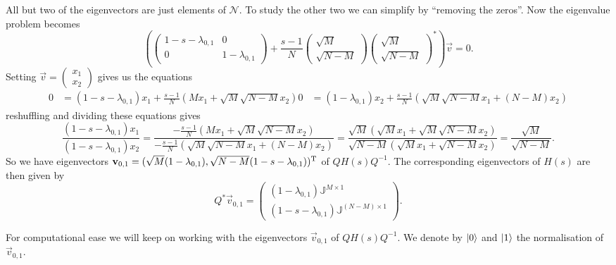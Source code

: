 All but two of the eigenvectors are just elements of $\mathcal{N}$. To study the other two we can simplify by ``removing the zeros''. Now the eigenvalue problem becomes
\[ \left(\begin{pmatrix}
1-s-\lambda_{0,1} & 0 \\ 0 & 1 -\lambda_{0,1}
\end{pmatrix} + \frac{s-1}{N}\begin{pmatrix}
\sqrt{M} \\ \sqrt{N-M}
\end{pmatrix}\begin{pmatrix}
\sqrt{M} \\ \sqrt{N-M}
\end{pmatrix}^*\right)\vec{v} = 0. \]
Setting $\vec{v} = \begin{pmatrix}
x_1 \\ x_2
\end{pmatrix}$ gives us the equations
\begin{align*}
0 &= (1-s-\lambda_{0,1})x_1 + \frac{s-1}{N}(Mx_1 + \sqrt{M}\sqrt{N-M}x_2)
0 &= (1-\lambda_{0,1})x_2 + \frac{s-1}{N}(\sqrt{M}\sqrt{N-M}x_1 + (N-M)x_2)
\end{align*}
reshuffling and dividing these equations gives
\[ \frac{(1-s-\lambda_{0,1})x_1}{(1-s-\lambda_{0,1})x_2} = \frac{-\frac{s-1}{N}(Mx_1 + \sqrt{M}\sqrt{N-M}x_2)}{-\frac{s-1}{N}(\sqrt{M}\sqrt{N-M}x_1 + (N-M)x_2)} = \frac{\sqrt{M}(\sqrt{M}x_1 + \sqrt{M}\sqrt{N-M}x_2)}{\sqrt{N-M}(\sqrt{M}x_1 + \sqrt{N-M}x_2)} = \frac{\sqrt{M}}{\sqrt{N-M}}. \]
So we have eigenvectors $\bm{\mathrm{v}}_{0,1} = (\sqrt{M}(1-\lambda_{0,1}), \sqrt{N-M}(1-s-\lambda_{0,1}))^{\mathrm{T}}$ of $QH(s)Q^{-1}$. The corresponding eigenvectors of $H(s)$ are then given by
\[ Q^*\vec{v}_{0,1} = \begin{pmatrix}
(1-\lambda_{0,1})\mathbb{J}^{M\times 1} \\ (1-s-\lambda_{0,1})\mathbb{J}^{(N-M)\times 1}
\end{pmatrix}. \]

For computational ease we will keep on working with the eigenvectors $\vec{v}_{0,1}$ of $QH(s)Q^{-1}$. We denote by $\left| 0 \right\rangle$ and $\left| 1 \right\rangle$ the normalisation of $\vec{v}_{0,1}$.


